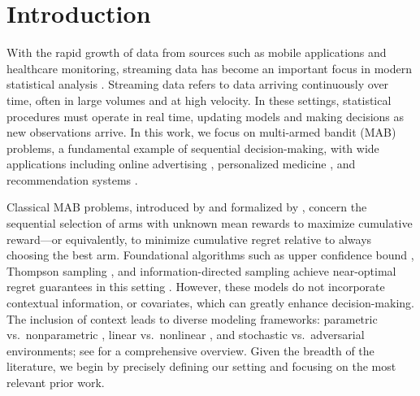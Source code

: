 \documentclass[aos,preprint]{imsart}
\theoremstyle{plain}
\theoremstyle{definition}
\begin{document}
\begin{frontmatter}
\begin{keyword}[class=MSC]
\end{keyword}

\begin{keyword}
\end{keyword}

\end{frontmatter}

\section{Introduction}
With the rapid growth of data from sources such as mobile applications    
and healthcare monitoring, streaming data has become an important focus in modern statistical analysis \citep{shalev2012online,lattimore2020bandit}. Streaming data refers to data arriving continuously over time, often in large volumes and at high velocity. In these settings, statistical procedures must operate in real time, updating models and making decisions as new observations arrive.
In this work, we focus on multi-armed bandit (MAB) problems,  a fundamental example of sequential decision-making, with wide applications including online advertising \citep{chapelle2011empirical}, personalized medicine \citep{tewari2017ads}, and recommendation systems \citep{Li2010}.

Classical MAB problems, introduced by \cite{thompson1933likelihood} and formalized by \cite{robbins1952some}, concern the sequential selection of arms with unknown mean rewards to maximize cumulative reward---or equivalently, to minimize cumulative regret relative to always choosing the best arm. Foundational algorithms such as upper confidence bound \citep{lai1985asymptotically, auer2002finite}, Thompson sampling \citep{agrawal2012analysis}, and information-directed sampling \citep{russo2018learning} achieve near-optimal regret guarantees in this setting \citep{audibert2009minimax, bubeck2012regret}. However, these models do not incorporate contextual information, or covariates, which can greatly enhance decision-making. The inclusion of context leads to diverse modeling frameworks: parametric \citep{li2010contextual} vs.\ nonparametric \citep{perchet2013multi}, linear \citep{abbasi2011improved, goldenshluger2013linear, bastani2020online, bastani2021mostly} vs.\ nonlinear \citep{jun2017scalable, ding2021efficient}, and stochastic \citep{goldenshluger2013linear, bastani2020online, bastani2021mostly} vs.\ adversarial \citep{auer2002nonstochastic, kakade2008efficient} environments;  see \cite{lattimore2020bandit} for a comprehensive overview. Given the breadth of the literature, we begin by precisely defining our setting and focusing on the most relevant prior work.  
\end{document}
